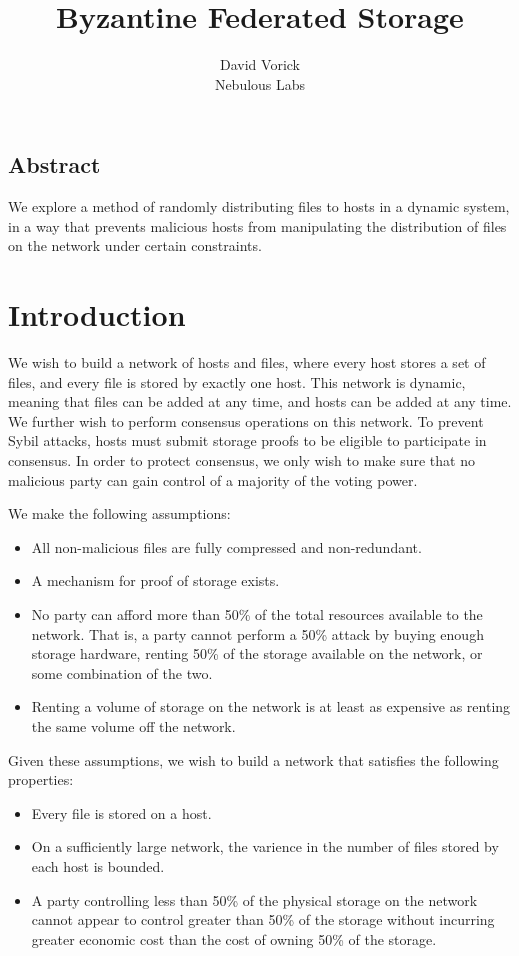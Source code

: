 \documentclass[twocolumn]{article}
\begin{document}
\frenchspacing

\title{Byzantine Federated Storage}

\author{
{\rm David Vorick}\\
Nebulous Labs
}

\maketitle

\subsection*{Abstract}
We explore a method of randomly distributing files to hosts in a dynamic system, in a way that prevents malicious hosts from manipulating the distribution of files on the network under certain constraints.

\section{Introduction}
We wish to build a network of hosts and files, where every host stores a set of files, and every file is stored by exactly one host.
This network is dynamic, meaning that files can be added at any time, and hosts can be added at any time.
We further wish to perform consensus operations on this network.
To prevent Sybil attacks, hosts must submit storage proofs to be eligible to participate in consensus.
In order to protect consensus, we only wish to make sure that no malicious party can gain control of a majority of the voting power.

We make the following assumptions:
\begin{itemize}
	\item All non-malicious files are fully compressed and non-redundant.
	\item A mechanism for proof of storage exists.
	\item No party can afford more than 50\% of the total resources available to the network. That is, a party cannot perform a 50\% attack by buying enough storage hardware, renting 50\% of the storage available on the network, or some combination of the two.
	\item Renting a volume of storage on the network is at least as expensive as renting the same volume off the network.
\end{itemize}

Given these assumptions, we wish to build a network that satisfies the following properties:
\begin{itemize}
	\item Every file is stored on a host.
	\item On a sufficiently large network, the varience in the number of files stored by each host is bounded.
	\item A party controlling less than 50\% of the physical storage on the network cannot appear to control greater than 50\% of the storage without incurring greater economic cost than the cost of owning 50\% of the storage.
\end{itemize}
\end{document}
